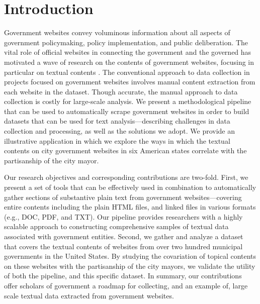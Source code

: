 \documentclass[11pt]{article}
\begin{document}
\section{Introduction} \vspace{-.2cm}
Government websites convey voluminous information about all aspects of government policymaking, policy implementation, and public deliberation. The vital role of official websites in connecting the government and the governed has motivated a wave of research on the contents of government websites, focusing in particular on textual contents \citep[e.g.,][]{grimmelikhuijsen2010transparency,wang2005evaluating,osman2014cobra,Eschenfelder2002}. The conventional approach to data collection in projects focused on government websites involves manual content extraction from each website in the dataset. Though accurate, the manual approach to data collection is costly for large-scale analysis. We present a methodological pipeline that can be used to automatically scrape government websites in order to build datasets that can be used for text analysis---describing challenges in data collection and processing, as well as the solutions we adopt. We provide an illustrative application in which we explore the ways in which the textual contents on city government websites in six American states correlate with the partisanship of the city mayor.

Our research objectives and corresponding contributions are two-fold. First, we present a set of tools that can be effectively used in combination to automatically gather sections of substantive plain text from government websites---covering entire contents including the plain HTML files, and linked files in various formats (e.g., DOC, PDF, and TXT). Our pipeline provides researchers with a highly scalable approach to constructing comprehensive samples of textual data associated with government entities. Second, we gather and analyze a dataset that covers the textual contents of websites from over two hundred municipal governments in the United States. By studying the covariation of topical contents on these websites with the partisanship of the city mayors, we validate the utility of both the pipeline, and this specific dataset. In summary, our contributions offer scholars of government a roadmap for collecting, and an example of, large scale textual data extracted from government websites.
\end{document}
